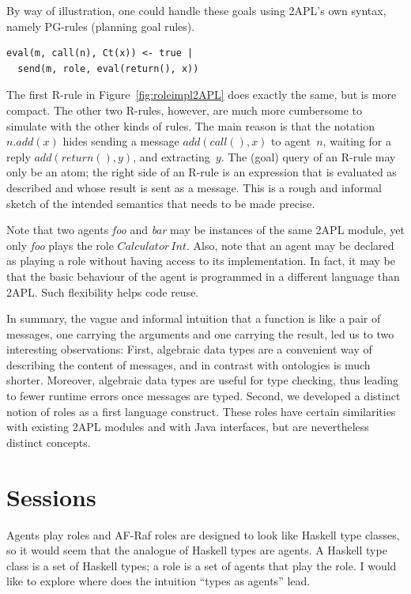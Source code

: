 \documentclass[a4paper,12pt,oneside,fleqn]{book} %
\newcommand{\todo}[1]{[\textcolor{red}{TODO}: #1]}
\begin{document}
By way of illustration, one could handle these goals using 2APL's own
syntax, namely PG-rules (planning goal rules).

\begin{verbatim}
eval(m, call(n), Ct(x)) <- true |
  send(m, role, eval(return(), x))
\end{verbatim}

The first R-rule in Figure~\ref{fig:roleimpl2APL} does exactly the same,
but is more compact. The other two R-rules, however, are much more
cumbersome to simulate with the other kinds of rules. The main reason is
that the notation $n.\mathit{add}(x)$ hides sending a message
$\mathit{add}(\mathit{call}(),x)$ to agent~$n$, waiting for a reply
$\mathit{add}(\mathit{return}(),y)$, and extracting~$y$. The (goal) query
of an R-rule may only be an atom; the right side of an R-rule is an
expression that is evaluated as described and whose result is sent as a
message.  This is a rough and informal sketch of the intended semantics
that needs to be made precise.

Note that two agents \textit{foo} and \textit{bar} may be instances of the
same 2APL module, yet only \textit{foo} plays the role
$\mathit{Calculator}\,\mathit{Int}$. Also, note that an agent may be
declared as playing a role without having access to its implementation. In
fact, it may be that the basic behaviour of the agent is programmed in a
different language than 2APL. Such flexibility helps code reuse.

In summary, the vague and informal intuition that a function is like a pair
of messages, one carrying the arguments and one carrying the result, led us
to two interesting observations: First, algebraic data types are a
convenient way of describing the content of messages, and in contrast with
ontologies is much shorter. Moreover, algebraic data types are useful for
type checking, thus leading to fewer runtime errors once messages are
typed. Second, we developed a distinct notion of roles as a first language
construct. These roles have certain similarities with existing 2APL modules
and with Java interfaces, but are nevertheless distinct concepts.


\section{Sessions}\label{sec:sessions} %

Agents play roles and AF-Raf roles are designed to look like Haskell type
classes, so it would seem that the analogue of Haskell types are
agents. A Haskell type class is a set of Haskell types; a role is a
set of agents that play the role. I would like to explore where
does the intuition ``types as agents'' lead.
\end{document}
